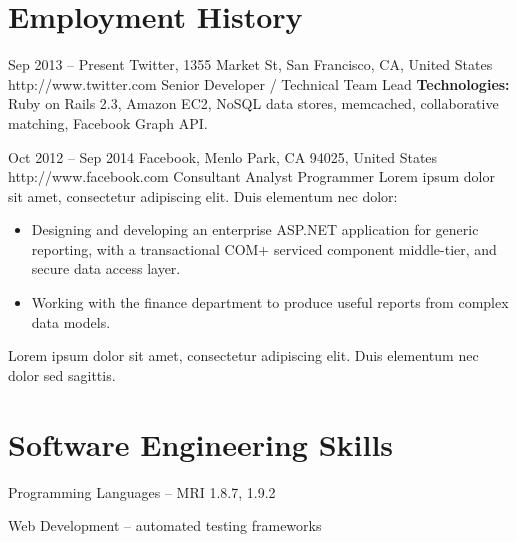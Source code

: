 \documentclass{article}
\begin{document}
\section{Employment History}

\begin{job}
{Sep 2013  -- Present}
{Twitter, 1355 Market St, San Francisco, CA, United States}
{http://www.twitter.com}
{Senior Developer / Technical Team Lead}%
\blindtext
\medbreak
\textbf{Technologies:} Ruby on Rails 2.3, Amazon EC2, NoSQL data stores, memcached, collaborative matching, Facebook Graph API.
\end{job}

\begin{job}
{Oct 2012  -- Sep 2014}
{Facebook, Menlo Park, CA 94025, United States}
{http://www.facebook.com}
{Consultant Analyst Programmer}%
Lorem ipsum dolor sit amet, consectetur adipiscing elit. Duis elementum nec dolor:

\begin{itemize}
\item{Designing and developing an enterprise ASP.NET application for generic reporting, with a transactional COM+ serviced component middle-tier, and secure data access layer.}
\item{Working with the finance department to produce useful reports from complex data models.}
\end{itemize}

Lorem ipsum dolor sit amet, consectetur adipiscing elit. Duis elementum nec dolor sed sagittis.
\end{job}


\section{Software Engineering Skills}

\begin{skillgroup}{Programming Languages}%
	 -- MRI 1.8.7, 1.9.2
\end{skillgroup}

\begin{skillgroup}{Web Development}%
	 -- automated testing frameworks
\end{skillgroup}
\end{document}
